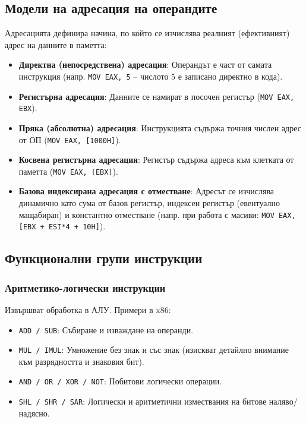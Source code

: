 \documentclass{scrartcl}
\begin{document}
\begin{FlushLeft}
\subsection{Модели на адресация на операндите}
Адресацията дефинира начина, по който се изчислява реалният (ефективният) адрес на данните в паметта:
\begin{itemize}
    \item \textbf{Директна (непосредствена) адресация}: Операндът е част от самата инструкция (напр. \texttt{MOV EAX, 5} – числото 5 е записано директно в кода).
    \item \textbf{Регистърна адресация}: Данните се намират в посочен регистър (\texttt{MOV EAX, EBX}).
    \item \textbf{Пряка (абсолютна) адресация}: Инструкцията съдържа точния числен адрес от ОП (\texttt{MOV EAX, [1000H]}).
    \item \textbf{Косвена регистърна адресация}: Регистър съдържа адреса към клетката от паметта (\texttt{MOV EAX, [EBX]}).
    \item \textbf{Базова индексирана адресация с отместване}: Адресът се изчислява динамично като сума от базов регистър, индексен регистър (евентуално мащабиран) и константно отместване (напр. при работа с масиви: \texttt{MOV EAX, [EBX + ESI*4 + 10H]}).
\end{itemize}

\subsection{Функционални групи инструкции}

\subsubsection{Аритметико-логически инструкции}
Извършват обработка в АЛУ. Примери в x86:
\begin{itemize}
    \item \texttt{ADD / SUB}: Събиране и изваждане на операнди.
    \item \texttt{MUL / IMUL}: Умножение без знак и със знак (изискват детайлно внимание към разрядността и знаковия бит).
    \item \texttt{AND / OR / XOR / NOT}: Побитови логически операции.
    \item \texttt{SHL / SHR / SAR}: Логически и аритметични измествания на битове наляво/надясно.
\end{itemize}


\end{FlushLeft}
\end{document}

